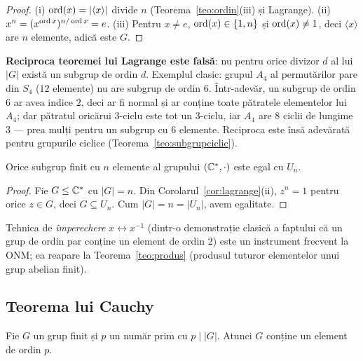 \begin{proof}
(i) $\operatorname{ord}(x)=|\langle x\rangle|$ divide $n$ (Teorema~\ref{teo:ordin}(iii) și Lagrange). (ii) $x^n=(x^{\operatorname{ord} x})^{n/\operatorname{ord} x}=e$. (iii) Pentru $x\neq e$, $\operatorname{ord}(x)\in\{1,n\}$ și $\operatorname{ord}(x)\neq 1$, deci $\langle x\rangle$ are $n$ elemente, adică este $G$.
\end{proof}

\begin{observatie}
\textbf{Reciproca teoremei lui Lagrange este falsă}: nu pentru orice divizor $d$ al lui $|G|$ există un subgrup de ordin $d$. Exemplul clasic: grupul $A_4$ al permutărilor pare din $S_4$ ($12$ elemente) nu are subgrup de ordin $6$. Într-adevăr, un subgrup de ordin $6$ ar avea indice $2$, deci ar fi normal și ar conține toate pătratele elementelor lui $A_4$; dar pătratul oricărui $3$-ciclu este tot un $3$-ciclu, iar $A_4$ are $8$ ciclii de lungime $3$ --- prea mulți pentru un subgrup cu $6$ elemente. Reciproca este însă adevărată pentru grupurile ciclice (Teorema~\ref{teo:subgrupciclic}).
\end{observatie}

\begin{propozitie}\label{prop:subgrupC}
Orice subgrup finit cu $n$ elemente al grupului $(\mathbb{C}^*,\cdot)$ este egal cu $U_n$.
\end{propozitie}

\begin{proof}
Fie $G\le\mathbb{C}^*$ cu $|G|=n$. Din Corolarul~\ref{cor:lagrange}(ii), $z^n=1$ pentru orice $z\in G$, deci $G\subseteq U_n$. Cum $|G|=n=|U_n|$, avem egalitate.
\end{proof}

\begin{observatie}
Tehnica de \emph{împerechere} $x\leftrightarrow x^{-1}$ (dintr-o demonstrație clasică a faptului că un grup de ordin par conține un element de ordin $2$) este un instrument frecvent la ONM; ea reapare la Teorema~\ref{teo:produs} (produsul tuturor elementelor unui grup abelian finit).
\end{observatie}

\subsection*{Teorema lui Cauchy}

\begin{teorema}[Cauchy]\label{teo:cauchy}
Fie $G$ un grup finit și $p$ un număr prim cu $p\mid|G|$. Atunci $G$ conține un element de ordin $p$.
\end{teorema}

